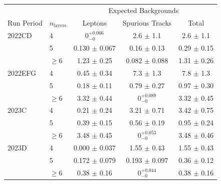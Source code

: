 \begin{tabular}{llccc}
\toprule
 & & \multicolumn{3}{c}{Expected Backgrounds} \\
Run Period & $n_{\mathrm{layers}}$ & Leptons & Spurious Tracks & Total \\
\midrule
2022CD & 4 & $0^{+0.066}_{-0}$ & 2.6 $\pm$ 1.1 & 2.6 $\pm$ 1.1 \\
 & 5 & 0.130 $\pm$ 0.067 & 0.16 $\pm$ 0.13 & 0.29 $\pm$ 0.15 \\
 & $\geq 6$ & 1.23 $\pm$ 0.25 & 0.082 $\pm$ 0.088 & 1.31 $\pm$ 0.26 \\
\midrule
2022EFG & 4 & 0.45 $\pm$ 0.34 & 7.3 $\pm$ 1.3 & 7.8 $\pm$ 1.3 \\
 & 5 & 0.18 $\pm$ 0.11 & 0.79 $\pm$ 0.27 & 0.97 $\pm$ 0.30 \\
 & $\geq 6$ & 3.32 $\pm$ 0.44 & $0^{+0.089}_{-0}$ & 3.32 $\pm$ 0.45 \\
\midrule
2023C & 4 & 0.21 $\pm$ 0.24 & 3.21 $\pm$ 0.71 & 3.42 $\pm$ 0.75 \\
 & 5 & 0.39 $\pm$ 0.15 & 0.56 $\pm$ 0.19 & 0.95 $\pm$ 0.24 \\
 & $\geq 6$ & 3.48 $\pm$ 0.45 & $0^{+0.053}_{-0}$ & 3.48 $\pm$ 0.46 \\
\midrule
2023D & 4 & 0.000 $\pm$ 0.037 & 1.55 $\pm$ 0.43 & 1.55 $\pm$ 0.43 \\
 & 5 & 0.172 $\pm$ 0.079 & 0.193 $\pm$ 0.097 & 0.36 $\pm$ 0.12 \\
 & $\geq 6$ & 0.38 $\pm$ 0.16 & $0^{+0.044}_{-0}$ & 0.38 $\pm$ 0.16 \\
\bottomrule
\end{tabular}
